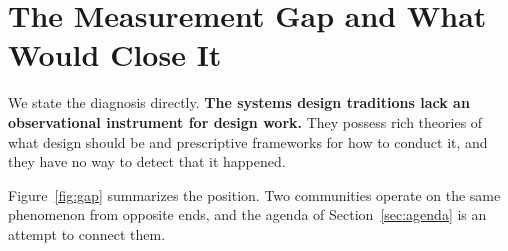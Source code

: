 \documentclass[11pt,a4paper]{article}
\begin{document}
\section{The Measurement Gap and What Would Close It}
\label{sec:gap}

We state the diagnosis directly. \textbf{The systems design traditions lack an
observational instrument for design work.} They possess rich theories of what
design should be and prescriptive frameworks for how to conduct it, and they
have no way to detect that it happened.

Figure~\ref{fig:gap} summarizes the position. Two communities operate on the
same phenomenon from opposite ends, and the agenda of
Section~\ref{sec:agenda} is an attempt to connect them.
\end{document}
